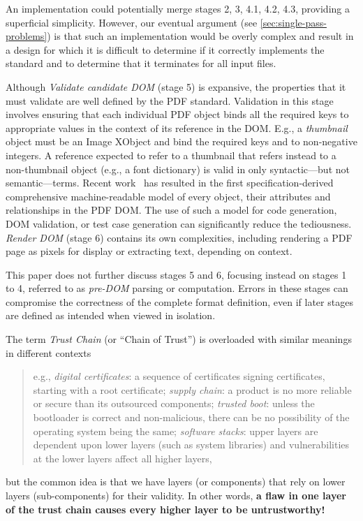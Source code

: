 An implementation could potentially merge stages 2, 3, 4.1, 4.2, 4.3,
providing a superficial simplicity.
%
However, our eventual argument (see \cref{sec:single-pass-problems})
is that such an implementation would be overly complex and result in a
design for which it is difficult to determine if it correctly
implements the standard and to determine that it terminates for all
input files.

%
Although \emph{Validate candidate DOM} (stage 5) is expansive, the
properties that it must validate are well defined by the 
PDF standard.
%
Validation in this stage involves ensuring that each individual PDF
object binds all the required keys to appropriate values in the context
of its reference in the DOM.
%
E.g., a \emph{thumbnail} object must be an Image XObject and bind the
required keys  and  to non-negative
integers.
%
A reference expected to refer to a thumbnail that refers instead to a
non-thumbnail object (e.g., a font dictionary) is valid in only
syntactic---but not semantic---terms.
%
Recent work~\cite{peterwyattArlingtonPDFModel2021} has resulted in the
first specification-derived comprehensive machine-readable model of
every object, their attributes and relationships in the PDF DOM. The
use of such a model for code generation, DOM validation, or test case
generation can significantly reduce the tediousness.
%
\emph{Render DOM} (stage 6) contains its own complexities, including
rendering a PDF page as pixels for display or extracting text,
depending on context.

%
This paper does not further discuss stages 5 and 6, focusing instead
on stages 1 to 4, referred to as \emph{pre-DOM} parsing or
computation.
%
Errors in these stages can compromise the correctness of the complete
format definition, even if later stages are defined as intended when
viewed in isolation.



The term \emph{Trust Chain} (or ``Chain of Trust'') is
overloaded with similar meanings in different contexts
%
%
\begin{quote}
e.g.,
\emph{digital certificates}: a sequence of certificates signing certificates,
starting with a root certificate;
\emph{supply chain}: a product is no more reliable or secure than its
outsourced components;
\emph{trusted boot}: unless the bootloader is correct and non-malicious,
there can be no possibility of the operating system being the same;
\emph{software stacks}: upper layers are dependent upon lower layers (such as
system libraries) and vulnerabilities at the lower layers affect all higher
layers,
\end{quote}
but the common idea is that we have layers (or components) that rely
on lower layers (sub-components) for their validity.  In other words,
{\textbf{a flaw in one layer of the trust chain causes every higher
    layer to be untrustworthy!}}

